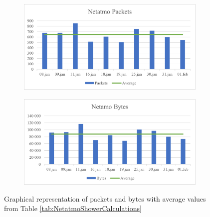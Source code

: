\begin{figure}[H]
    \centering
    \begin{subfigure}{0.49\textwidth}
       \includegraphics[width=1\hsize]{figures/Netatmo_Shower_Calculations_Packets.png} 
    \end{subfigure}
    \begin{subfigure}{0.49\textwidth}
        \includegraphics[width=1\hsize]{figures/Netatmo_Shower_Calculations_Bytes.png} 
    \end{subfigure}
    \caption{Graphical representation of packets and bytes with average values from Table \ref{tab:NetatmoShowerCalculations}}
    \label{fig:NetatmoShowerCalculations}
\end{figure}

